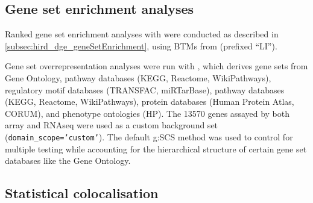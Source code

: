 

\subsection{Gene set enrichment analyses}

Ranked gene set enrichment analyses with  were conducted as described in \cref{subsec:hird_dge_geneSetEnrichment},
using \glspl{BTM} from \textcite{li2013MolecularSignaturesAntibody} (prefixed \enquote{LI}).

Gene set overrepresentation analyses were run with  \autocite{raudvere2019ProfilerWebServer},
which derives gene sets from
    Gene Ontology,
    pathway databases (KEGG, Reactome, WikiPathways),
    regulatory motif databases (TRANSFAC, miRTarBase),
    pathway databases (KEGG, Reactome, WikiPathways),
    protein databases (Human Protein Atlas, CORUM),
    and phenotype ontologies (HP).
The 13570 genes assayed by both array and \gls{RNAseq} were used as a custom background set (\texttt{domain\_scope='custom'}).
The default g:SCS method was used to control for multiple testing while accounting for the hierarchical structure of certain gene set databases like the Gene Ontology.

\subsection{Statistical colocalisation}
\label{subsec:hird_reQTL_coloc}

